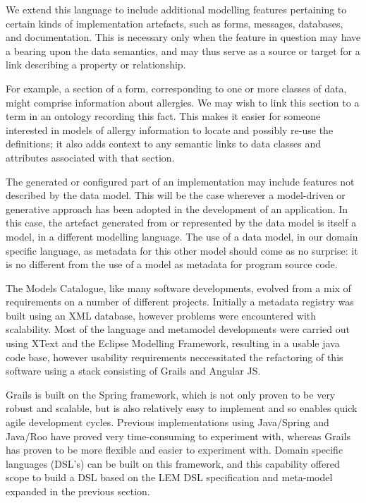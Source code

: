 We extend this language to include additional modelling features
pertaining to certain kinds of implementation artefacts, such as
forms, messages, databases, and documentation.  This is necessary only
when the feature in question may have a bearing upon the data
semantics, and may thus serve as a source or target for a link
describing a property or relationship.  

For example, a section of a form, corresponding to one or more classes
of data, might comprise information about allergies.  We may wish to
link this section to a term in an ontology recording this fact.  This
makes it easier for someone interested in models of allergy
information to locate and possibly re-use the definitions; it also
adds context to any semantic links to data classes and attributes
associated with that section.

The generated or configured part of an implementation may include
features not described by the data model.  This will be the case
wherever a model-driven or generative approach has been adopted in the
development of an application.  In this case, the artefact generated
from or represented by the data model is itself a model, in a
different modelling language.  The use of a data model, in our domain
specific language, as metadata for this other model should come as no
surprise: it is no different from the use of a model as metadata for
program source code. 

The Models Catalogue, like many software developments, evolved from a mix of requirements on a number of different projects.  Initially a metadata registry was built using an XML database, however problems were encountered with scalability.  Most of the language and metamodel developments were carried out using XText and the Eclipse Modelling Framework, resulting in a usable java code base, however usability requirements neccessitated the refactoring of this software using a stack consisting of Grails and Angular JS. 

Grails is built on the Spring framework, which is not only proven to be very robust and scalable, but is also relatively easy to implement and so enables quick agile development cycles. Previous implementations using Java/Spring and Java/Roo have proved very time-consuming to experiment with, whereas Grails has proven to be more flexible and easier to experiment with.  Domain specific languages (DSL’s) can be  built on this framework, and this capability offered scope to build a DSL based on the LEM DSL specification and meta-model expanded in the previous section.
 
